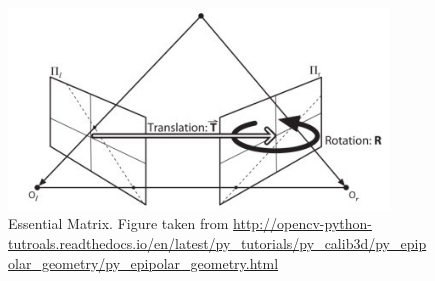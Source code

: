\begin{figure}[h!]
\centering
\includegraphics[width = 0.9\textwidth]{./Diagrams/essential_matrix.jpg}
\caption{Essential Matrix. Figure taken from \url{http://opencv-python-tutroals.readthedocs.io/en/latest/py_tutorials/py_calib3d/py_epipolar_geometry/py_epipolar_geometry.html}}
\label{fig:essential_matrix.jpg}
\end{figure}

